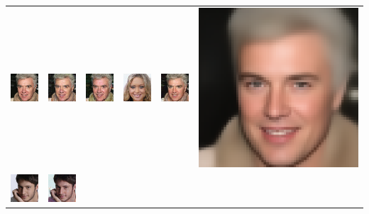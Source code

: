 \begin{table}[h!]
{\begin{tabular}{cccccc}
        \includegraphics[width=.145\textwidth]{chapter4/figures/images/celebA/original/8.png} &   
        \includegraphics[width=.145\textwidth]{chapter4/figures/images/celebA/reconstruction/8.png} &
        \includegraphics[width=.145\textwidth]{chapter4/figures/images/celebA/corrected_reconstruction/8.png} &
        \includegraphics[width=.145\textwidth]{chapter4/figures/images/celebA/diffusion_decoder_beta_0.01/8.png} &
        \includegraphics[width=.145\textwidth]{chapter4/figures/images/celebA/diffusion_decoder_beta_0/8.png} &
        \includegraphics[width=.145\textwidth]{chapter4/figures/images/celebA/VAE_reconstruction/8.png} \\
        \includegraphics[width=.145\textwidth]{chapter4/figures/images/celebA/original/9.png} &   
        \includegraphics[width=.145\textwidth]{chapter4/figures/images/celebA/reconstruction/9.png} &

\end{tabular}}
\end{table}
